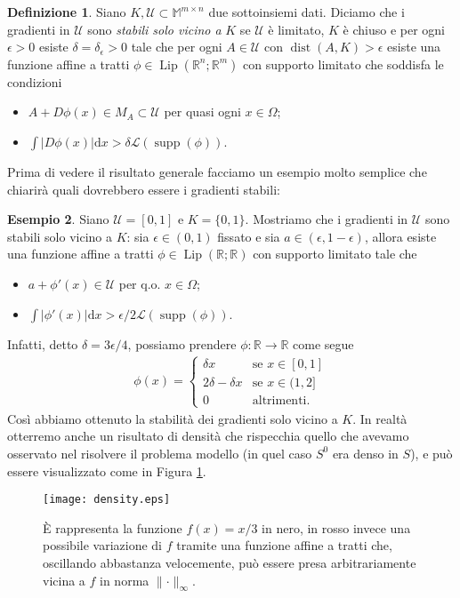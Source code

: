 \documentclass[a4paper,11pt]{book}
\theoremstyle{plain}
\theoremstyle{definition}
\newtheorem{defn}{Definizione}[chapter]
\newtheorem{exmp}[defn]{Esempio}
\theoremstyle{remark}
\newcommand{\R}{\mathbb{R}}
\newcommand{\M}{\mathbb{M}}
\newcommand{\LL}{\mathscr{L}}
\newcommand{\norm}[1]{\lVert#1\rVert}
\newcommand{\dx}{\text{d}x}
\DeclareMathOperator{\supp}{supp}
\DeclareMathOperator{\dist}{dist}
\DeclareMathOperator{\Lip}{Lip}
\begin{document}
\begin{defn}
	Siano $K,\mathcal{U}\subset \M^{m\times n}$ due sottoinsiemi dati. Diciamo che i gradienti in $\mathcal{U}$ sono \textit{stabili solo vicino a} $K$ se $\mathcal{U}$ è limitato, $K$ è chiuso e per ogni $\epsilon > 0$ esiste $\delta=\delta_{\epsilon}>0$ tale che per ogni $A\in\mathcal{U}$ con $\dist(A,K)>\epsilon$ esiste una funzione affine a tratti $\phi\in\Lip(\R^n;\R^m)$ con supporto limitato che soddisfa le condizioni
	\begin{itemize}
		\item $A+D\phi(x)\in M_A\subset \mathcal{U}$ per quasi ogni $x\in\Omega$;
		\item $\int|D\phi(x)|\dx > \delta \LL(\supp(\phi))$.
	\end{itemize}
\end{defn}

Prima di vedere il risultato generale facciamo un esempio molto semplice che chiarirà quali dovrebbero essere i gradienti stabili:
\begin{exmp}
	Siano $\mathcal{U}=[0,1]$ e $K=\{0,1\}$. Mostriamo che i gradienti in $\mathcal{U}$ sono stabili solo vicino a $K$: sia $\epsilon\in(0,1)$ fissato e sia $a\in (\epsilon,1-\epsilon)$, allora esiste una funzione affine a tratti $\phi\in\Lip(\R;\R)$ con supporto limitato tale che
	\begin{itemize}
		\item $a+\phi'(x)\in \mathcal{U}$ per q.o. $x\in \Omega$;{}
		\item $\int|\phi'(x)|\dx > \epsilon/2\LL(\supp(\phi))$.
	\end{itemize}
	Infatti, detto $\delta=3\epsilon/4$, possiamo prendere $\phi:\R\to\R$ come segue
	\begin{align*}
		\phi(x) = \begin{cases}
						\delta x & \text{se }x\in[0,1]\\
						2\delta-\delta x & \text{se }x\in(1,2]\\
						0 & \text{altrimenti}.
				  \end{cases}
	\end{align*}
	Così abbiamo ottenuto la stabilità dei gradienti solo vicino a $K$. In realtà otterremo anche un risultato di densità che rispecchia quello che avevamo osservato nel risolvere il problema modello (in quel caso $S^{0}$ era denso in $S$), e può essere visualizzato come in Figura \ref{fig:6}.
	\begin{figure}[h!]
	\begin{minipage}[c]{0.6\textwidth}
		\texttt{[image: density.eps]}
	\end{minipage}\hfill
	\begin{minipage}[c]{0.35\textwidth}
		\caption{È rappresenta la funzione $f(x)=x/3$ in nero, in rosso invece una possibile variazione di $f$ tramite una funzione affine a tratti che, oscillando abbastanza velocemente, può essere presa arbitrariamente vicina a $f$ in norma $\norm{\cdot}_{\infty}$.}
		\label{fig:6}
	\end{minipage}
\end{figure}
\end{exmp}
\end{document}
